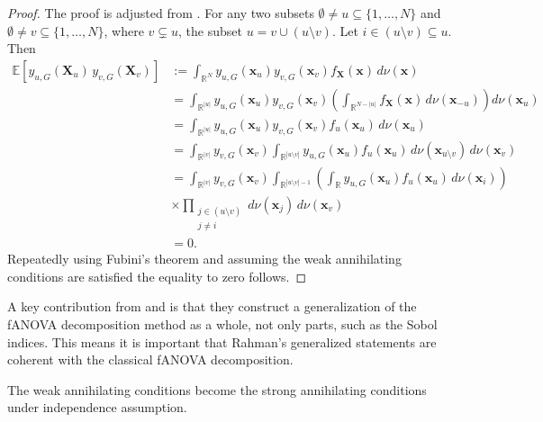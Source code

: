 \begin{proof}
The proof is adjusted from \cite{rahman2014}. For any two subsets $\emptyset \ne u \subseteq \{1,\dots,N\}$ and $\emptyset \ne v \subseteq \{1,\dots,N\}$, where $v \subsetneq u$, the subset $u = v \cup (u \setminus v)$. Let $i \in (u \setminus v) \subseteq u$. Then
\begin{align*}
\mathbb{E}[y_{u,G}(\boldsymbol{X}_u) \, y_{v,G}(\boldsymbol{X}_v)]
&:= \int_{\mathbb{R}^N} y_{u,G}(\boldsymbol{x}_u) y_{v,G}(\boldsymbol{x}_v) f_{\boldsymbol{X}}(\boldsymbol{x}) \, d \nu(\boldsymbol{x}) \\[0.5em]
&= \int_{\mathbb{R}^{|u|}} y_{u,G}(\boldsymbol{x}_u) y_{v,G}(\boldsymbol{x}_v) \left( \int_{\mathbb{R}^{N - |u|}} f_{\boldsymbol{X}}(\boldsymbol{x}) \, d \nu(\boldsymbol{x}_{-u}) \right) d \nu(\boldsymbol{x}_u) \\[0.5em]
&= \int_{\mathbb{R}^{|u|}} y_{u,G}(\boldsymbol{x}_u) y_{v,G}(\boldsymbol{x}_v) f_u(\boldsymbol{x}_u) \, d \nu(\boldsymbol{x}_u) \\[0.5em]
&= \int_{\mathbb{R}^{|v|}} y_{v,G}(\boldsymbol{x}_v)
    \int_{\mathbb{R}^{|u \setminus v|}} y_{u,G}(\boldsymbol{x}_u) f_u(\boldsymbol{x}_u) \, d \nu(\boldsymbol{x}_{u \setminus v}) \, d \nu(\boldsymbol{x}_v) \\[0.5em]
&= \int_{\mathbb{R}^{|v|}} y_{v,G}(\boldsymbol{x}_v)
    \int_{\mathbb{R}^{|u \setminus v| - 1}} \left( \int_{\mathbb{R}} y_{u,G}(\boldsymbol{x}_u) f_u(\boldsymbol{x}_u) \, d \nu(\boldsymbol{x}_i) \right) \\[0.5em]
&\times \prod_{\substack{j \in (u \setminus v) \\ j \ne i}} d \nu(\boldsymbol{x}_j) \, d \nu(\boldsymbol{x}_v) \\[0.5em]
&= 0.
\end{align*}
Repeatedly using Fubini's theorem and assuming the weak annihilating conditions are satisfied the equality to zero follows.
\end{proof}

A key contribution from \cite{hooker2007} and \cite{rahman2014} is that they construct a generalization of the fANOVA decomposition method as a whole, not only parts, such as the Sobol indices.
This means it is important that Rahman's generalized statements are coherent with the classical fANOVA decomposition.
\begin{proposition}
    The weak annihilating conditions become the strong annihilating conditions under independence assumption.
    \label{prop:weak_strong}
\end{proposition}

